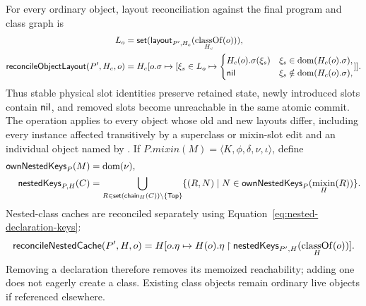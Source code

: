 For every ordinary object, layout reconciliation against the final program
and class graph is
\begin{equation}\label{eq:reconcile-object-layout}
\begin{aligned}
 L_o&=\mathsf{set}(\mathsf{layout}_{P',H_c}(\mathop{\mathrm{classOf}}_{H_c}(o))),\\
 \mathsf{reconcileObjectLayout}(P',H_c,o)
   &=H_c[o.\sigma\mapsto
       [\xi_s\in L_o\mapsto
          \begin{cases}H_c(o).\sigma(\xi_s)&\xi_s\in\mathop{\mathrm{dom}}(H_c(o).\sigma),\\
                        \mathsf{nil}&\xi_s\notin\mathop{\mathrm{dom}}(H_c(o).\sigma),
          \end{cases}]] .
\end{aligned}
\end{equation}
Thus stable physical slot identities preserve retained state, newly introduced
slots contain $\mathsf{nil}$, and removed slots become unreachable in the same atomic
commit.  The operation applies to every object whose old and new layouts
differ, including every instance affected transitively by a superclass or
mixin-slot edit and an individual object named by .
If $P.\mathit{mixin}(M)=\langle K,\phi,\delta,\nu,\iota\rangle$, define
\begin{equation}\label{eq:nested-declaration-keys}
\begin{aligned}
 \mathsf{ownNestedKeys}_{P}(M)&=\mathop{\mathrm{dom}}(\nu),\\
 \mathsf{nestedKeys}_{P,H}(C)
  &=\bigcup_{R\in\mathsf{set}(\mathsf{chain}_H(C))\setminus\{\mathsf{Top}\}}
       \{(R,N)\mid N\in\mathsf{ownNestedKeys}_{P}(\mathop{\mathrm{mixin}}_H(R))\}.
\end{aligned}
\end{equation}
Nested-class caches are reconciled separately using
Equation~\eqref{eq:nested-declaration-keys}:
\begin{equation}\label{eq:reconcile-nested-cache}
 \mathsf{reconcileNestedCache}(P',H,o)=
 H[o.\eta\mapsto H(o).\eta\mathbin{\upharpoonright}
   \mathsf{nestedKeys}_{P',H}(\mathop{\mathrm{classOf}}_H(o))].
\end{equation}
Removing a declaration therefore removes its memoized reachability; adding one
does not eagerly create a class.  Existing class objects remain ordinary live
objects if referenced elsewhere.

